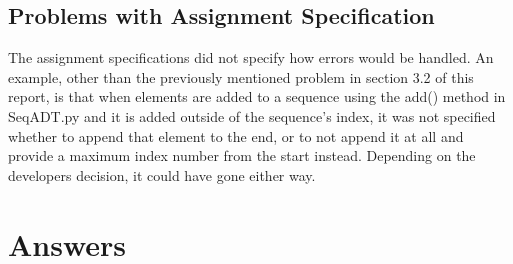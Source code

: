 \documentclass[12pt]{article}
\begin{document}
\subsection{Problems with Assignment Specification}
The assignment specifications did not specify how errors would be handled. An example, other than the previously mentioned problem in section 3.2 of this report, is that when elements are added to a sequence using the add() method in SeqADT.py and it is added outside of the sequence's index, it was not specified whether to append that element to the end, or to not append it at all and provide a maximum index number from the start instead. Depending on the developers decision, it could have gone either way.

\section{Answers}
\end{document}
